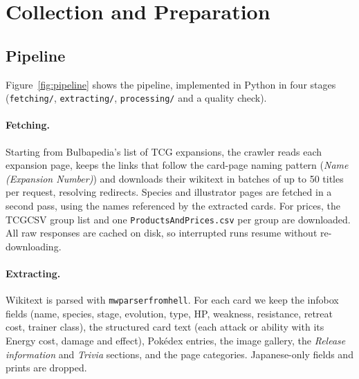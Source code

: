 \documentclass[sigconf]{acmart}
\begin{document}

  \section{Collection and Preparation}

  \subsection{Pipeline}

  Figure~\ref{fig:pipeline} shows the pipeline, implemented in Python in
  four stages (\texttt{fetching/}, \texttt{extracting/}, \texttt{processing/}
  and a quality check).

  \paragraph{Fetching.}
  Starting from Bulbapedia's list of TCG expansions, the crawler reads each
  expansion page, keeps the links that follow the card-page naming pattern
  (\textit{Name (Expansion Number)}) and downloads their wikitext in batches
  of up to 50 titles per request, resolving redirects. Species and illustrator
  pages are fetched in a second pass, using the names referenced by the
  extracted cards. For prices, the TCGCSV group list and one
  \texttt{ProductsAndPrices.csv} per group are downloaded. All raw responses
  are cached on disk, so interrupted runs resume without re-downloading.

  \paragraph{Extracting.}
  Wikitext is parsed with \texttt{mwparserfromhell}. For each card we keep
  the infobox fields (name, species, stage, evolution, type, HP, weakness,
  resistance, retreat cost, trainer class), the structured card text (each
  attack or ability with its Energy cost, damage and effect), Pok\'edex
  entries, the image gallery, the \emph{Release information} and
  \emph{Trivia} sections, and the page categories. Japanese-only fields and
  prints are dropped.
\end{document}
